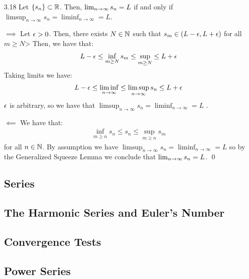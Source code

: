 \setcounter{rudin}{17}
\begin{theorem}{}{3.18}
    Let $\set{s_n} \subset \mathbb{R}$. Then, $\lim_{n \rightarrow \infty} s_n = L$ if and only if $\limsup_{n \rightarrow \infty} s_n = \liminf_{n \rightarrow \infty} = L$.
\end{theorem}
\begin{nproof}
    $\boxed{\implies}$ Let $\epsilon > 0$. Then, there exists $N \in \mathbb{N}$ such that $s_m \in (L - \epsilon, L + \epsilon)$ for all $m \geq N$> Then, we have that:
    \begin{align*}
        L - \epsilon \leq \inf_{m \geq N} s_m \leq \sup_{m \geq N} \leq L + \epsilon
    \end{align*}
    Taking limits we have:
    \begin{align*}
        L - \epsilon \leq \liminf_{n \rightarrow \infty} \leq \limsup_{n \rightarrow \infty} s_n  \leq L + \epsilon
    \end{align*}
    $\epsilon$ is arbitrary, so we have that $\limsup_{n \rightarrow \infty} s_n = \liminf_{n \rightarrow \infty} = L$ .

    $\boxed{\impliedby}$ We have that:
    \begin{align*}
        \inf_{m \geq n} s_n \leq s_n \leq \sup_{m \geq n} s_m
    \end{align*}
    for all $n \in \mathbb{N}$. By assumption we have $\limsup_{n \rightarrow \infty} s_n = \liminf_{n \rightarrow \infty} = L$ so by the Generalized Squeeze Lemma we conclude that $\lim_{n \rightarrow \infty} s_n = L$. \qed
\end{nproof}
\subsection{Series}

\subsection{The Harmonic Series and Euler's Number}
\subsection{Convergence Tests}
\subsection{Power Series}


